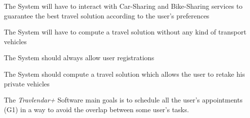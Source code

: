 \begin{goalList}
\item The System will have to interact with Car-Sharing and Bike-Sharing services to guarantee the best travel solution according to the user's preferences

\item The System will have to compute a travel solution without any kind of transport vehicles

\item The System should always allow user registrations

\item The System should compute a travel solution which allows the user to retake his private vehicles

\end{goalList}


The \emph{Travlendar+} Software main goals is to schedule all the user's appointments (G1) in a way to avoid the overlap between some user's tasks. 
